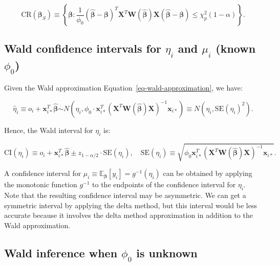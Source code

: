 \documentclass[
  11pt,
  letterpaper,
  oneside]{book}
\theoremstyle{definition}
\theoremstyle{plain}
\theoremstyle{plain}
\theoremstyle{plain}
\theoremstyle{remark}
\begin{document}
\[
\text{CR}(\boldsymbol{\beta}_S) \equiv \left\{\boldsymbol{\beta}: \frac{1}{\phi_0} (\boldsymbol{\widehat \beta} - \boldsymbol{\beta})^T \boldsymbol{X}^T \boldsymbol{W}(\boldsymbol{\widehat \beta}) \boldsymbol{X} (\boldsymbol{\widehat \beta} - \boldsymbol{\beta}) \leq \chi^2_{p}(1-\alpha)\right\}.
\]

\hypertarget{sec-wald-ci-fitted-values}{%
\subsection{\texorpdfstring{Wald confidence intervals for \(\eta_i\) and
\(\mu_i\) (known
\(\phi_0\))}{Wald confidence intervals for \textbackslash eta\_i and \textbackslash mu\_i (known \textbackslash phi\_0)}}\label{sec-wald-ci-fitted-values}}

Given the Wald approximation Equation~\ref{eq-wald-approximation}, we
have:

\[
\widehat \eta_i \equiv o_i + \boldsymbol{x}_{i*}^T \boldsymbol{\widehat \beta} \overset{\cdot}{\sim} N(\eta_i, \phi_0 \cdot \boldsymbol{x}_{i*}^T (\boldsymbol{X}^T \boldsymbol{W}(\boldsymbol{\widehat \beta}) \boldsymbol{X})^{-1} \boldsymbol{x}_{i*}) \equiv N(\eta_i, \text{SE}(\eta_i)^2).
\]

Hence, the Wald interval for \(\eta_i\) is:

\[
\text{CI}(\eta_i) \equiv o_i + \boldsymbol{x}_{i*}^T \boldsymbol{\widehat\beta} \pm z_{1-\alpha/2} \cdot \text{SE}(\eta_i), \quad \text{SE}(\eta_i) \equiv \sqrt{\phi_0 \boldsymbol{x}_{i*}^T (\boldsymbol{X}^T \boldsymbol{W}(\boldsymbol{\widehat \beta}) \boldsymbol{X})^{-1} \boldsymbol{x}_{i*}}.
\]

A confidence interval for
\(\mu_i \equiv \mathbb{E}_{\boldsymbol{\beta}}[y_i] = g^{-1}(\eta_i)\)
can be obtained by applying the monotonic function \(g^{-1}\) to the
endpoints of the confidence interval for \(\eta_i\). Note that the
resulting confidence interval may be asymmetric. We can get a symmetric
interval by applying the delta method, but this interval would be less
accurate because it involves the delta method approximation in addition
to the Wald approximation.

\hypertarget{sec-wald-inference-unknown-dispersion}{%
\subsection{\texorpdfstring{Wald inference when \(\phi_0\) is
unknown}{Wald inference when \textbackslash phi\_0 is unknown}}\label{sec-wald-inference-unknown-dispersion}}
\end{document}
